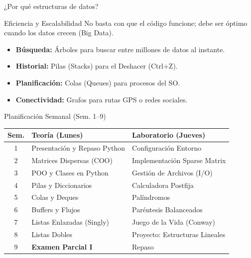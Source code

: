 \documentclass[11pt]{beamer}
\begin{document}
\begin{frame}{¿Por qué estructuras de datos?}
\begin{block}{Eficiencia y Escalabilidad}
No basta con que el código funcione; debe ser óptimo cuando los datos crecen (Big Data).
\end{block}
\begin{itemize}
\item \textbf{Búsqueda:} Árboles para buscar entre millones de datos al instante.
\item \textbf{Historial:} Pilas (Stacks) para el Deshacer (Ctrl+Z).
\item \textbf{Planificación:} Colas (Queues) para procesos del SO.
\item \textbf{Conectividad:} Grafos para rutas GPS o redes sociales.
\end{itemize}
\end{frame}

\begin{frame}{Planificación Semanal (Sem. 1--9)}
\centering
\tiny
\begin{tabular}{cll}
\toprule
\textbf{Sem.} & \textbf{Teoría (Lunes)} & \textbf{Laboratorio (Jueves)} \\
\midrule
1  & Presentación y Repaso Python & Configuración Entorno \\
2  & Matrices Dispersas (COO) & Implementación Sparse Matrix \\
3  & POO y Clases en Python & Gestión de Archivos (I/O) \\
4  & Pilas y Diccionarios & Calculadora Postfija \\
5  & Colas y Deques & Palíndromos \\
6  & Buffers y Flujos & Paréntesis Balanceados \\
7  & Listas Enlazadas (Singly) & Juego de la Vida (Conway) \\
8  & Listas Dobles & Proyecto: Estructuras Lineales \\
9  & \textbf{Examen Parcial I} & Repaso \\
\bottomrule
\end{tabular}
\end{frame}
\end{document}
